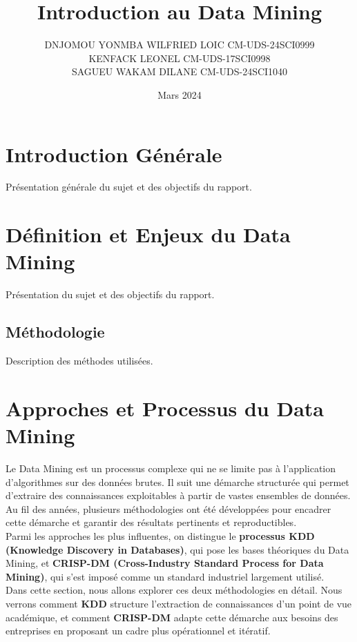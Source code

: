\documentclass[a4paper,12pt]{report}
\title{ Introduction au Data Mining}
\author{DNJOMOU YONMBA WILFRIED LOIC CM-UDS-24SCI0999 \\
KENFACK LEONEL CM-UDS-17SCI0998\\
SAGUEU WAKAM DILANE CM-UDS-24SCI1040\\}
\date{Mars 2024}
\begin{document}
\maketitle

\renewcommand{\contentsname}{Table des matières}

\tableofcontents

\renewcommand{\chaptername}{Chapitre}

\chapter*{Introduction Générale}
Présentation générale du sujet et des objectifs du rapport.

\chapter{Définition et Enjeux du Data Mining}
Présentation du sujet et des objectifs du rapport.

    \section{Méthodologie}
    Description des méthodes utilisées.

\chapter{Approches et Processus du Data Mining}
    Le Data Mining est un processus complexe qui ne se limite pas à l’application d’algorithmes sur des données brutes. Il suit une démarche structurée qui permet d’extraire des connaissances exploitables à partir de vastes ensembles de données. Au fil des années, plusieurs méthodologies ont été développées pour encadrer cette démarche et garantir des résultats pertinents et reproductibles.\\
    Parmi les approches les plus influentes, on distingue le \textbf{processus KDD (Knowledge Discovery in Databases)}, qui pose les bases théoriques du Data Mining, et \textbf{CRISP-DM (Cross-Industry Standard Process for Data Mining)}, qui s’est imposé comme un standard industriel largement utilisé.\\
    Dans cette section, nous allons explorer ces deux méthodologies en détail. Nous verrons comment \textbf{KDD} structure l’extraction de connaissances d’un point de vue académique, et comment \textbf{CRISP-DM} adapte cette démarche aux besoins des entreprises en proposant un cadre plus opérationnel et itératif.
\end{document}
